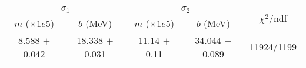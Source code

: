 \begin{tabular}{cc|cc||c}
\multicolumn{2}{c|}{$\sigma_1$} & \multicolumn{2}{|c}{$\sigma_2$} & \multirow{2}{*}{$\chi^2/$ndf} \\
$m$ ($\times1e5$) & $b$ (MeV) & $m$ ($\times1e5$) & $b$ (MeV) & \\
\hline
8.588 $\pm$ 0.042 & 18.338 $\pm$ 0.031 & 11.14 $\pm$ 0.11 & 34.044 $\pm$ 0.089 & 11924/1199\\
\end{tabular}
